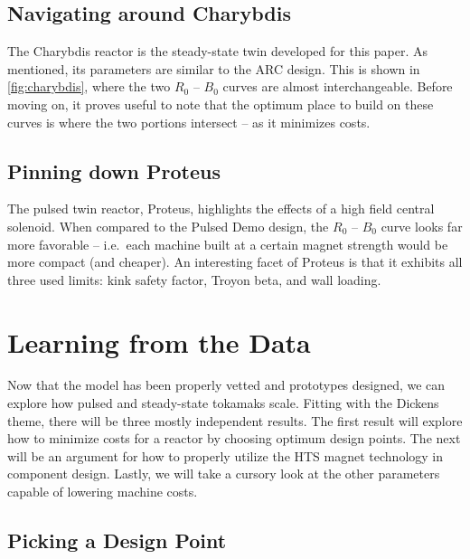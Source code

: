 \begin{table}[h!]
\begin{subtable}[t]{0.5\textwidth}
\begin{tabular}{ c|c }
\end{tabular}
\end{subtable}
\hfill
\hfill
\label{table:proteus}
\end{table}

\clearpage

\newpage

\subsection{Navigating around Charybdis}

The Charybdis reactor is the steady-state twin developed for this paper. As mentioned, its parameters are similar to the ARC design. This is shown in \cref{fig:charybdis}, where the two $R_0$ -- $B_0$ curves are almost interchangeable. Before moving on, it proves useful to note that the optimum place to build on these curves is where the two portions intersect -- as it minimizes costs. 

\subsection{Pinning down Proteus}

The pulsed twin reactor, Proteus, highlights the effects of a high field central solenoid. When compared to the Pulsed Demo design, the $R_0$ -- $B_0$ curve looks far more favorable -- i.e.\ each machine built at a certain magnet strength would be more compact (and cheaper). An interesting facet of Proteus is that it exhibits all three used limits: kink safety factor, Troyon beta, and wall loading.  

\section{Learning from the Data}

Now that the model has been properly vetted and prototypes designed, we can explore how pulsed and steady-state tokamaks scale. Fitting with the Dickens theme, there will be three mostly independent results. The first result will explore how to minimize costs for a reactor by choosing optimum design points. The next will be an argument for how to properly utilize the HTS magnet technology in component design. Lastly, we will take a cursory look at the other parameters capable of lowering machine costs.

\subsection{Picking a Design Point}


